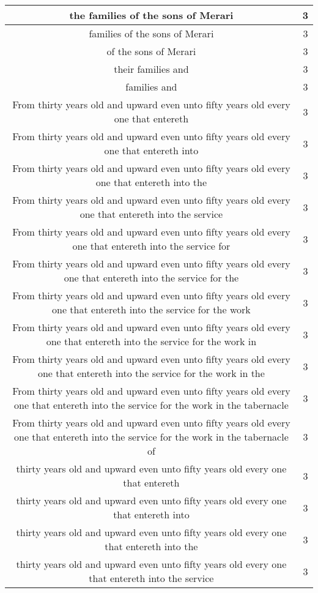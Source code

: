\begin{center}
\begin{longtable}{|c|c|}
the families of the sons of Merari & 3\\ \hline 
families of the sons of Merari & 3\\ \hline 
of the sons of Merari & 3\\ \hline 
their families and & 3\\ \hline 
families and & 3\\ \hline 
From thirty years old and upward even unto fifty years old every one that entereth & 3\\ \hline 
From thirty years old and upward even unto fifty years old every one that entereth into & 3\\ \hline 
From thirty years old and upward even unto fifty years old every one that entereth into the & 3\\ \hline 
From thirty years old and upward even unto fifty years old every one that entereth into the service & 3\\ \hline 
From thirty years old and upward even unto fifty years old every one that entereth into the service for & 3\\ \hline 
From thirty years old and upward even unto fifty years old every one that entereth into the service for the & 3\\ \hline 
From thirty years old and upward even unto fifty years old every one that entereth into the service for the work & 3\\ \hline 
From thirty years old and upward even unto fifty years old every one that entereth into the service for the work in & 3\\ \hline 
From thirty years old and upward even unto fifty years old every one that entereth into the service for the work in the & 3\\ \hline 
From thirty years old and upward even unto fifty years old every one that entereth into the service for the work in the tabernacle & 3\\ \hline 
From thirty years old and upward even unto fifty years old every one that entereth into the service for the work in the tabernacle of & 3\\ \hline 
thirty years old and upward even unto fifty years old every one that entereth & 3\\ \hline 
thirty years old and upward even unto fifty years old every one that entereth into & 3\\ \hline 
thirty years old and upward even unto fifty years old every one that entereth into the & 3\\ \hline 
thirty years old and upward even unto fifty years old every one that entereth into the service & 3\\ \hline 

\end{longtable}
\end{center}
